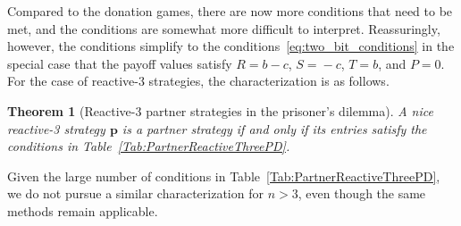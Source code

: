 \documentclass[11pt]{article}
\theoremstyle{plainCl1}
\newtheorem{theorem}{Theorem}
\theoremstyle{plainCl2}
\begin{document}
\noindent
Compared to the donation games, there are now more conditions that need to be met, and the conditions are somewhat more difficult to interpret. Reassuringly, however, the conditions simplify to the conditions~\eqref{eq:two_bit_conditions} in the special case that the payoff values satisfy $R\!=\!b\!-\!c$, $S\!=\!-c$, $T\!=\!b$, and $P\!=\!0$. 
For the case of reactive-3 strategies, the characterization is as follows. 



\begin{theorem}[Reactive-3 partner strategies in the prisoner's dilemma]
\label{theorem:reactive_three_partner_strategies_PD}
A nice reactive-3 strategy $\mathbf{p}$ is a partner strategy if and only if its entries satisfy the conditions in Table~\ref{Tab:PartnerReactiveThreePD}. 
\end{theorem}

\noindent
Given the large number of conditions in Table~\ref{Tab:PartnerReactiveThreePD}, we do not pursue a similar characterization for $n\!>\!3$, even though the same methods remain applicable. \\
\end{document}
